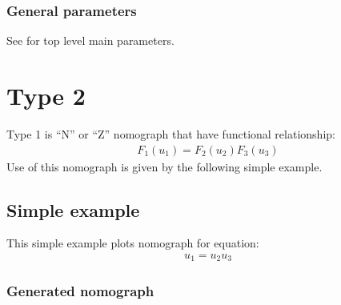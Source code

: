 \documentclass[a4paper,11pt,english]{sphinxmanual}
\begin{document}
\subsubsection{General parameters}
\label{\detokenize{types/types:general-parameters}}
See {\hyperref[\detokenize{main_params:main-params}]{}} for top level main parameters.


\section{Type 2}
\label{\detokenize{types/types:type-2}}\label{\detokenize{types/types:type2-ref}}
Type 1 is “N” or “Z” nomograph that have functional relationship:
\begin{equation*}
\begin{split}F_1(u_1) = F_2(u_2) F_3(u_3)\end{split}
\end{equation*}
Use of this nomograph is given by the following
simple example.


\subsection{Simple example}
\label{\detokenize{types/types:id1}}
This simple example plots nomograph for equation:
\begin{equation*}
\begin{split}u_1 = u_2 u_3\end{split}
\end{equation*}

\subsubsection{Generated nomograph}
\label{\detokenize{types/types:id2}}
\noindent{}
\end{document}

